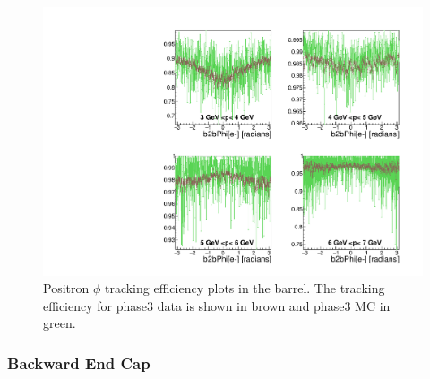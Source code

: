 \documentclass[a4paper,11pt,twosided,final,german,openbib,pdftex,listof=totoc,bibliography=totoc]{scrbook}
\begin{document}
\begin{figure}[!htbp]
	\centering
	\includegraphics[width=\textwidth]{Plots/master3/xPMPhiepBarrelP3}
	\caption[Momentum $\phi$ Positron Barrel Efficiency Phase3]{Positron $\phi$ tracking efficiency plots in the barrel. The tracking efficiency for phase3 data is shown in brown and phase3 MC in green.}
	\label{plt:xPMPhiepBarrel3}
\end{figure}













\newpage

\subsubsection{Backward End Cap}
\end{document}
